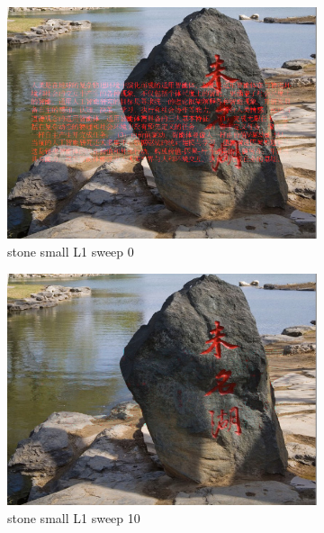 \documentclass[11pt]{article}
\begin{document}
\begin{figure}[ht!]
    \centering
    \hfill%
    \begin{subfigure}[]{0.333\linewidth}
        \centering
        \includegraphics[width=\linewidth]{fig/restoration/stone_small/L1/gibbs_0.jpg}
        \caption{stone small L1 sweep 0}
    \end{subfigure}%
    \hfill%
    \begin{subfigure}[]{0.333\linewidth}
        \centering
        \includegraphics[width=\linewidth]{fig/restoration/stone_small/L1/gibbs_10.jpg}
        \caption{stone small L1 sweep 10}
    \end{subfigure}%
    \hfill%
    \begin{subfigure}[]{0.333\linewidth}

\end{subfigure}
\end{figure}
\end{document}
